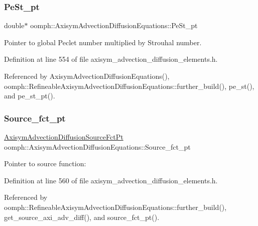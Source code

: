 \subsubsection{\texorpdfstring{Pe\+St\+\_\+pt}{PeSt\_pt}}
{\footnotesize\ttfamily double$\ast$ oomph\+::\+Axisym\+Advection\+Diffusion\+Equations\+::\+Pe\+St\+\_\+pt\hspace{0.3cm}{\ttfamily [protected]}}



Pointer to global Peclet number multiplied by Strouhal number. 



Definition at line 554 of file axisym\+\_\+advection\+\_\+diffusion\+\_\+elements.\+h.



Referenced by Axisym\+Advection\+Diffusion\+Equations(), oomph\+::\+Refineable\+Axisym\+Advection\+Diffusion\+Equations\+::further\+\_\+build(), pe\+\_\+st(), and pe\+\_\+st\+\_\+pt().

\mbox{\label{classoomph_1_1AxisymAdvectionDiffusionEquations_a498d9045921930191e9a8022b7f5f1e5}} 
\subsubsection{\texorpdfstring{Source\+\_\+fct\+\_\+pt}{Source\_fct\_pt}}
{\footnotesize\ttfamily \hyperlink{classoomph_1_1AxisymAdvectionDiffusionEquations_a5110527308cbe58e90fb9ac146d172a0}{Axisym\+Advection\+Diffusion\+Source\+Fct\+Pt} oomph\+::\+Axisym\+Advection\+Diffusion\+Equations\+::\+Source\+\_\+fct\+\_\+pt\hspace{0.3cm}{\ttfamily [protected]}}



Pointer to source function\+: 



Definition at line 560 of file axisym\+\_\+advection\+\_\+diffusion\+\_\+elements.\+h.



Referenced by oomph\+::\+Refineable\+Axisym\+Advection\+Diffusion\+Equations\+::further\+\_\+build(), get\+\_\+source\+\_\+axi\+\_\+adv\+\_\+diff(), and source\+\_\+fct\+\_\+pt().

